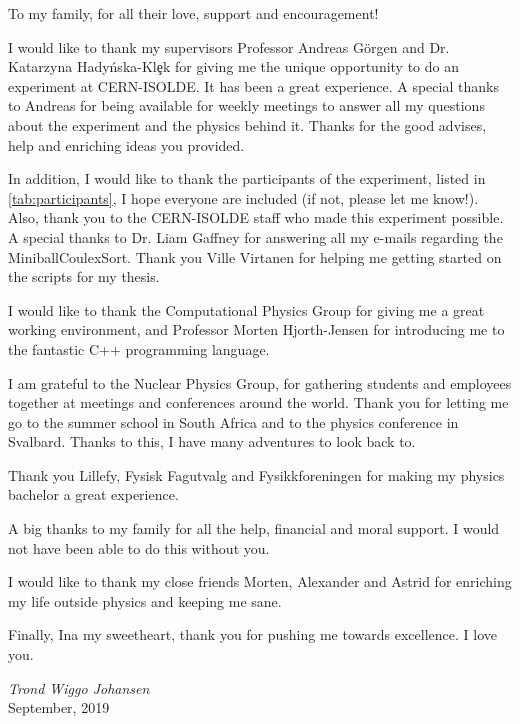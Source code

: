 \documentclass[twoside,english]{uiofysmaster/uiofysmaster}
\let\orgautoref\autoref
\renewcommand{\autoref}
        {%
		 \def\sectionautorefname{Section}%
		 \def\subsectionautorefname{Section}%
		 \def\subsubsectionautorefname{Section}%
		 \def\chapterautorefname{Chapter}%
          \orgautoref}
\begin{document}
\begin{dedication}
To my family, for all their love, support and encouragement!

\end{dedication}

\begin{acknowledgements}

I would like to thank my supervisors Professor Andreas Görgen and Dr. Katarzyna Hady{\'{n}}ska-Kl{\c{e}}k for giving me the unique opportunity to do an experiment at CERN-ISOLDE. 
It has been a great experience.
A special thanks to Andreas for being available for weekly meetings to answer all my questions about the experiment and the physics behind it.
Thanks for the good advises, help and enriching ideas you provided.

In addition, I would like to thank the participants of the experiment, listed in \autoref{tab:participants}, I hope everyone are included (if not, please let me know!).
Also, thank you to the CERN-ISOLDE staff who made this experiment possible.
A special thanks to Dr. Liam Gaffney for answering all my e-mails regarding the MiniballCoulexSort.
Thank you Ville Virtanen for helping me getting started on the scripts for my thesis. 

I would like to thank the Computational Physics Group for giving me a great working environment, and Professor Morten Hjorth-Jensen for introducing me to the fantastic C++ programming language. 

I am grateful to the Nuclear Physics Group, for gathering students and employees together at meetings and conferences around the world. 
Thank you for letting me go to the summer school in South Africa and to the physics conference in Svalbard. 
Thanks to this, I have many adventures to look back to.

Thank you Lillefy, Fysisk Fagutvalg and Fysikkforeningen for making my physics bachelor a great experience.

A big thanks to my family for all the help, financial and moral support. 
I would not have been able to do this without you.

I would like to thank my close friends Morten, Alexander and Astrid for enriching my life outside physics and keeping me sane.

Finally, Ina my sweetheart, thank you for pushing me towards excellence. I love you.


  \vspace{1.5cm}
  
  \noindent\textit{Trond Wiggo Johansen}\\
  
  \noindent September, 2019

\end{acknowledgements}
\end{document}
